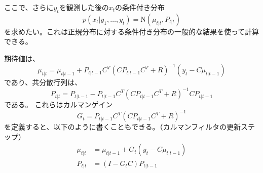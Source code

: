 \documentclass[textwidth-limit=45]{bxjsarticle}
\begin{document}
ここで、さらに$y_t$を観測した後の$x_t$の条件付き分布
\begin{equation}
  p(x_{t}|y_1, \dots, y_{t}) = \mathrm N(\mu_{t|t}, P_{t|t})
\end{equation}
を求めたい。これは正規分布に対する条件付き分布の一般的な結果を使って計算できる。

期待値は、
\begin{equation}
  \mu_{t|t} = \mu_{t|t-1} + P_{t|t-1}C^T (C P_{t|t-1} C^T + R)^{-1} (y_t - C\mu_{t|t-1})  
\end{equation}
であり、共分散行列は、
\begin{equation}
  P_{t|t} = P_{t|t-1} - P_{t|t-1} C^T (C P_{t|t-1} C^T + R)^{-1} C P_{t|t-1}
\end{equation}
である。
これらはカルマンゲイン
\begin{equation}
  G_t = P_{t|t-1} C^T (C P_{t|t-1} C^T + R)^{-1}
\end{equation}
を定義すると、以下のように書くこともできる。（カルマンフィルタの更新ステップ）
\begin{align}
  \mu_{t|t} &= \mu_{t|t-1} + G_t (y_t - C\mu_{t|t-1})  \\
  P_{t|t} &= (I- G_t C) P_{t|t-1}
\end{align}
\end{document}
